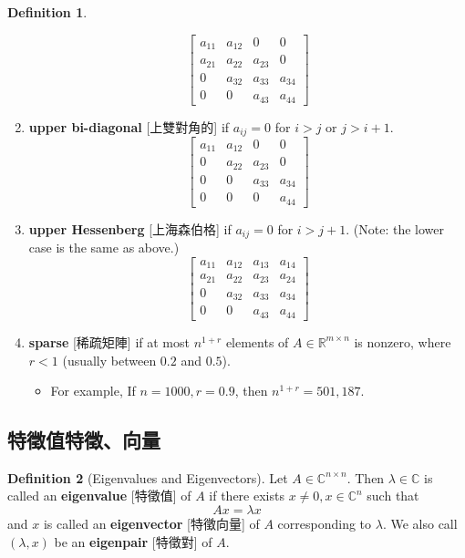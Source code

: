 \documentclass{article}
\theoremstyle{definition}
\newtheorem{definition}{Definition}[section]
\numberwithin{theorem}{section}
\numberwithin{equation}{section}
\begin{document}
\begin{definition}
\begin{enumerate}
  \[
   \begin{bmatrix}
   a_{11} & a_{12} & 0 & 0 \\
   a_{21} & a_{22} & a_{23} & 0 \\
   0 & a_{32} & a_{33} & a_{34} \\
   0 & 0 & a_{43} & a_{44}
   \end{bmatrix}
   \]
\item \textbf{upper bi-diagonal} [上雙對角的] if $a_{ij} = 0$ for $i > j$ or $j > i+1$.
  \[
   \begin{bmatrix}
   a_{11} & a_{12} & 0 & 0 \\
   0 & a_{22} & a_{23} & 0 \\
   0 & 0 & a_{33} & a_{34} \\
   0 & 0 & 0 & a_{44}
   \end{bmatrix}
   \]
\item \textbf{upper Hessenberg} [上海森伯格] if $a_{ij} = 0$ for $i > j+1$. (Note: the lower case is the same as above.)
  \[
   \begin{bmatrix}
   a_{11} & a_{12} & a_{13} & a_{14} \\
   a_{21} & a_{22} & a_{23} & a_{24} \\
   0 & a_{32} & a_{33} & a_{34} \\
   0 & 0 & a_{43} & a_{44}
   \end{bmatrix}
   \]
\item \textbf{sparse} [稀疏矩陣] if at most $n^{1+r}$ elements of $A \in \mathbb{R}^{m \times n}$ is nonzero, where $r < 1$ (usually between $0.2$ and $0.5$).
    \begin{itemize}
\item  For example, If $n = 1000, r = 0.9$, then $n^{1+r} = 501,187$.
\end{itemize}
\end{enumerate}
\end{definition}

\subsection{特徵值特徵、向量}

\begin{definition}[Eigenvalues and Eigenvectors]
    Let $A \in \mathbb{C}^{n \times n}$. Then $\lambda \in \mathbb{C}$ is called an \textbf{eigenvalue} [特徵值] of $A$ if there exists $x \neq 0, x \in \mathbb{C}^n$ such that
\[
Ax = \lambda x
\]
and $x$ is called an \textbf{eigenvector} [特徵向量] of $A$ corresponding to $\lambda$. We also call $(\lambda, x)$ be an \textbf{eigenpair} [特徵對] of $A$.
\end{definition}
\end{document}
